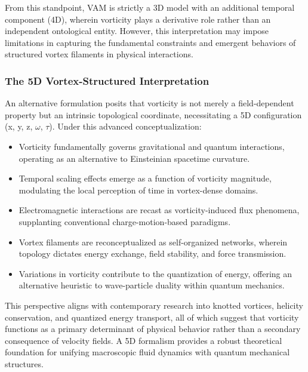 From this standpoint, VAM is strictly a 3D model with an additional temporal component (4D), wherein vorticity plays a derivative role rather than an independent ontological entity.
However, this interpretation may impose limitations in capturing the fundamental constraints and emergent behaviors of structured vortex filaments in physical interactions.

\subsubsection*{The 5D Vortex-Structured Interpretation}
An alternative formulation posits that vorticity is not merely a field-dependent property but an intrinsic topological coordinate, necessitating a 5D configuration (x, y, z, $\omega$, $\tau$).
Under this advanced conceptualization:

\begin{itemize}
    \item Vorticity fundamentally governs gravitational and quantum interactions, operating as an alternative to Einsteinian spacetime curvature.
    \item Temporal scaling effects emerge as a function of vorticity magnitude, modulating the local perception of time in vortex-dense domains.
    \item Electromagnetic interactions are recast as vorticity-induced flux phenomena, supplanting conventional charge-motion-based paradigms.
    \item Vortex filaments are reconceptualized as self-organized networks, wherein topology dictates energy exchange, field stability, and force transmission.
    \item Variations in vorticity contribute to the quantization of energy, offering an alternative heuristic to wave-particle duality within quantum mechanics.
\end{itemize}
This perspective aligns with contemporary research into knotted vortices, helicity conservation, and quantized energy transport, all of which suggest that vorticity functions as a primary determinant of physical behavior rather than a secondary consequence of velocity fields.
A 5D formalism provides a robust theoretical foundation for unifying macroscopic fluid dynamics with quantum mechanical structures.

